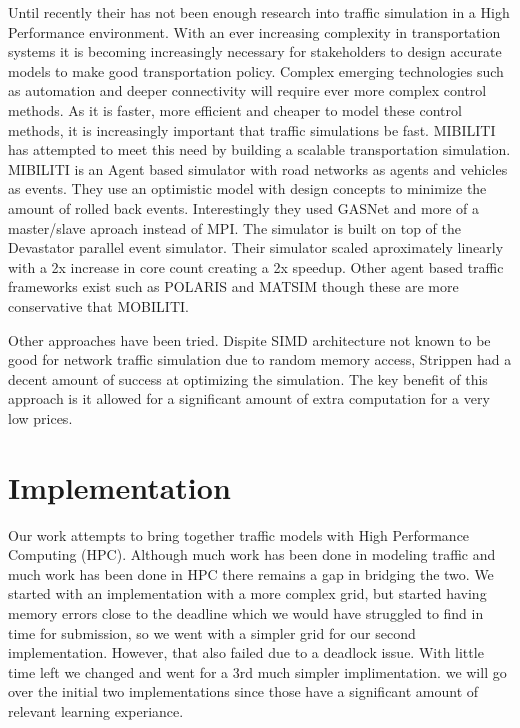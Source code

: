 \documentclass[10pt,a4paper]{article}
\begin{document}
    Until recently their has not been enough research into traffic simulation in a High Performance environment. With an ever increasing complexity in transportation systems it is becoming increasingly necessary for stakeholders to design accurate models to make good transportation policy. Complex emerging technologies such as automation and deeper connectivity will require ever more complex control methods. As it is faster, more efficient and cheaper to model these control methods, it is increasingly important that traffic simulations be fast. MIBILITI \cite{MOBILIT:2018} has attempted to meet this need by building a scalable transportation simulation. MIBILITI is an Agent based simulator with road networks as agents and vehicles as events. They use an optimistic model with design concepts to minimize the amount of rolled back events. Interestingly they used GASNet and more of a master/slave aproach instead of MPI. The simulator is built on top of the Devastator parallel event simulator. Their simulator scaled aproximately linearly with a 2x increase in core count creating a 2x speedup. Other agent based traffic frameworks exist such as POLARIS \cite{SOKOLOV2012854} and MATSIM \cite{Waraich2015} though these are more conservative that MOBILITI.
    
    Other approaches have been tried. Dispite SIMD architecture not known to be good for network traffic simulation due to random memory access, Strippen \cite{Strippgen:2009}had a decent amount of success at optimizing the simulation. The key benefit of this approach is it allowed for a significant amount of extra computation for a very low prices.
    \section{Implementation}
    
    Our work attempts to bring together traffic models with High Performance Computing (HPC). Although much work has been done in modeling traffic and much work has been done in HPC there remains a gap in bridging the two. We started with an implementation with a more complex grid, but started having memory errors close to the deadline which we would have struggled to find in time for submission, so we went with a simpler grid for our second implementation. However, that also failed due to a deadlock issue. With little time left we changed and went for a 3rd much simpler implimentation. we will go over the initial two implementations since those have a significant amount of relevant learning experiance.
    
\end{document}
